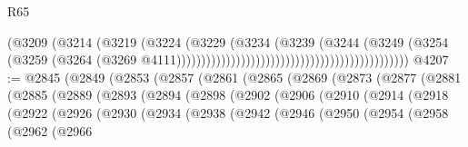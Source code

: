 \begin{lexlean}{R65}
\begin{coremodule}
{                                                                        (@3209
                                                                          (@3214
                                                                            (@3219
                                                                              (@3224
                                                                                (@3229
                                                                                  (@3234
                                                                                    (@3239
                                                                                      (@3244
                                                                                        (@3249
                                                                                          (@3254
                                                                                            (@3259
                                                                                              (@3264
                                                                                                (@3269
                                                                                                  @4111)))))))))))))))))))))))))))))))))))))))))))))))
@4207 := @2845
    (@2849
      (@2853
        (@2857
          (@2861
            (@2865
              (@2869
                (@2873
                  (@2877
                    (@2881
                      (@2885
                        (@2889
                          (@2893
                            (@2894
                              (@2898
                                (@2902
                                  (@2906
                                    (@2910
                                      (@2914
                                        (@2918
                                          (@2922
                                            (@2926
                                              (@2930
                                                (@2934
                                                  (@2938
                                                    (@2942
                                                      (@2946
                                                        (@2950
                                                          (@2954
                                                            (@2958
                                                              (@2962
                                                                (@2966
}
\end{coremodule}
\end{lexlean}
